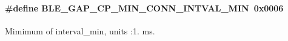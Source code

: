 \paragraph[{\texorpdfstring{B\+L\+E\+\_\+\+G\+A\+P\+\_\+\+C\+P\+\_\+\+M\+I\+N\+\_\+\+C\+O\+N\+N\+\_\+\+I\+N\+T\+V\+A\+L\+\_\+\+M\+IN}{BLE_GAP_CP_MIN_CONN_INTVAL_MIN}}]{\setlength{\rightskip}{0pt plus 5cm}\#define B\+L\+E\+\_\+\+G\+A\+P\+\_\+\+C\+P\+\_\+\+M\+I\+N\+\_\+\+C\+O\+N\+N\+\_\+\+I\+N\+T\+V\+A\+L\+\_\+\+M\+IN~0x0006}\hypertarget{group___b_l_e___g_a_p___c_p___r_a_n_g_e_ga58d9dd4e77f0e9f8cc5b094aa56468ab}{}\label{group___b_l_e___g_a_p___c_p___r_a_n_g_e_ga58d9dd4e77f0e9f8cc5b094aa56468ab}
Mimimum of interval\+\_\+min, units \+:1. ms. 